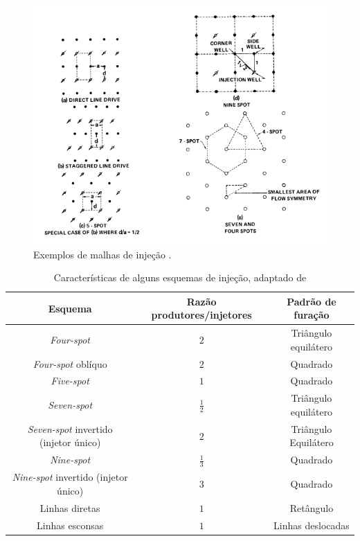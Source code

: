 \begin{figure}[!ht]
\centering
\includegraphics[width=.7\textwidth]{figs/revisao/revisao_injmalhas.png}
\caption{Exemplos de malhas de inje\c{c}\~{a}o \cite{singh1982}.}
\label{fig:rev_inj7i}
\end{figure}

\begin{table}[!ht]
	\centering
	\caption{Caracter\'{i}sticas de alguns esquemas de inje\c{c}\~{a}o, adaptado de \cite{singh1982}\label{tab:wfdpat}}
	\begin{tabular}{|c|c|c|}
		\hline
		\textbf{Esquema} & \textbf{Raz\~{a}o produtores/injetores} & \textbf{Padr\~{a}o de fura\c{c}\~{a}o} \\ \hline
		\textit{Four-spot} & $2$ & Tri\^{a}ngulo equil\'{a}tero \\ \hline
		\textit{Four-spot} obl\'{i}quo & $2$ & Quadrado \\ \hline
		\textit{Five-spot} & $1$ & Quadrado \\ \hline
		\textit{Seven-spot} & $\frac{1}{2}$ & Tri\^{a}ngulo equil\'{a}tero \\ \hline
		\textit{Seven-spot} invertido (injetor \'{u}nico) & $2$ & Tri\^{a}ngulo Equil\'{a}tero \\ \hline
		\textit{Nine-spot} & $\frac{1}{3}$ & Quadrado \\ \hline
		\textit{Nine-spot} invertido (injetor \'{u}nico) & $3$ & Quadrado \\ \hline
		Linhas diretas & $1$ & Ret\^{a}ngulo \\ \hline
		Linhas esconsas & $1$ & Linhas deslocadas \\ \hline
		
	\end{tabular}
\end{table}

